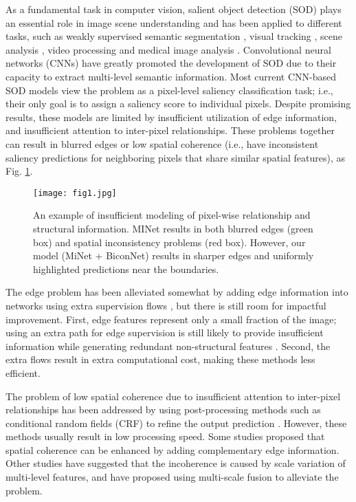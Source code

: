 \documentclass[review]{cvpr}
\begin{document}
As a fundamental task in computer vision, salient object detection (SOD) plays an essential role in image scene understanding \cite{review} and has been applied to different tasks, such as weakly supervised semantic segmentation \cite{weaksup1,weak_PR}, visual tracking \cite{visual_track_PR}, scene analysis \cite{scene1,scene2}, video processing \cite{video_PR} and medical image analysis \cite{medical1}. Convolutional neural networks (CNNs) have greatly promoted the development of SOD due to their capacity to extract multi-level semantic information. Most current CNN-based SOD models \cite{DSS,U2-Net} view the problem as a pixel-level saliency classification task; i.e., their only goal is to assign a saliency score to individual pixels. Despite promising results, these models are limited by insufficient utilization of edge information, and insufficient attention to inter-pixel relationships. These problems together can result in blurred edges or low spatial coherence (i.e., have inconsistent saliency predictions for neighboring pixels that share similar spatial features), as Fig. \ref{insufficient}.


\begin{figure}[h!]
\begin{center}
\setlength{\abovecaptionskip}{0.cm}
\texttt{[image: fig1.jpg]}
\end{center}
\vspace{-9pt}
\caption{An example of insufficient modeling of pixel-wise relationship and structural information. MINet \cite{MINet} results in both blurred edges ({\color{green}green} box) and spatial inconsistency problems ({\color{red}red} box). However, our model (MiNet + BiconNet) results in sharper edges and uniformly highlighted predictions near the boundaries.}
\vspace{-10pt}
\label{insufficient}
\end{figure}



The edge problem has been alleviated somewhat by adding edge information into networks using extra supervision flows \cite{egnet,scrn,ITSD}, but there is still room for impactful improvement. First, edge features represent only a small fraction of the image; using an extra path for edge supervision is still likely to provide insufficient information while generating redundant non-structural features \cite{MINet}. Second, the extra flows result in extra computational cost, making these methods less efficient.

The problem of low spatial coherence due to insufficient attention to inter-pixel relationships has been addressed by using post-processing methods such as conditional random fields (CRF) to refine the output prediction \cite{DSS,picanet,crf2}. However, these methods usually result in low processing speed. Some studies \cite{egnet,non-local} proposed that spatial coherence can be enhanced by adding complementary edge information. Other studies \cite{MINet,f3net} have suggested that the incoherence is caused by scale variation of multi-level features, and have proposed using multi-scale fusion to alleviate the problem.
\end{document}
